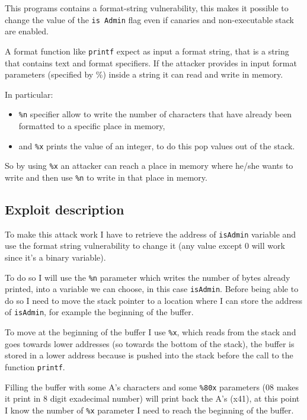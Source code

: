 \documentclass[a4paper,12pt]{article}
\begin{document}
This programs contains a format-string vulnerability, this makes it possible to change the value of the \texttt{is Admin} flag even if canaries and non-executable stack are enabled.

A format function like \texttt{printf} expect as input a format string, that is a string that contains text and format specifiers. If the attacker provides in input format parameters (specified by \%) inside a string it can read and write in memory. 

In particular:
\begin{itemize}
\item \texttt{\%n} specifier allow to write the number of characters that have already been formatted to a specific place in memory,
\item and \texttt{\%x} prints the value of an integer, to do this pop values out of the stack.
\end{itemize} 

So by using \texttt{\%x} an attacker can reach a place in memory where he/she wants to write and then use \texttt{\%n} to write in that place in memory.


\subsection{Exploit description}

To make this attack work I have to retrieve the address of \texttt{isAdmin} variable and use the format string vulnerability to change it (any value except 0 will work since it's a binary variable). 

To do so I will use the \texttt{\%n} parameter which writes the number of bytes already printed, into a variable we can choose, in this case \texttt{isAdmin}. Before being able to do so I need to move the stack pointer to a location where I can store the address of \texttt{isAdmin}, for example the beginning of the buffer.

To move at the beginning of the buffer I use \texttt{\%x}, which reads from the stack and goes towards lower addresses (so towards the bottom of the stack), the buffer is stored in a lower address because is pushed into the stack before the call to the function \texttt{printf}.

Filling the buffer with some A's characters and some \texttt{\%80x} parameters (08 makes it print in 8 digit exadecimal number) will print back the A's (x41), at this point I know the number of \texttt{\%x} parameter I need to reach the beginning of the buffer.
\end{document}
